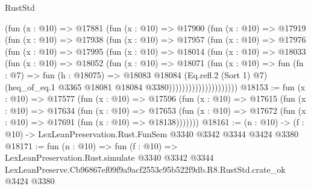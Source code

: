 \begin{lexlean}{RustStd}
\begin{coremodule}
                    (fun (x : @10) =>
                    @17881
                      (fun (x : @10) =>
                      @17900
                        (fun (x : @10) =>
                        @17919
                          (fun (x : @10) =>
                          @17938
                            (fun (x : @10) =>
                            @17957
                              (fun (x : @10) =>
                              @17976
                                (fun (x : @10) =>
                                @17995
                                  (fun (x : @10) =>
                                  @18014
                                    (fun (x : @10) =>
                                    @18033
                                      (fun (x : @10) =>
                                      @18052
                                        (fun (x : @10) =>
                                        @18071
                                          (fun (x : @10) =>
                                          fun (fn : @7) =>
                                          fun (h : @18075) =>
                                          @18083
                                            @18084
                                            (Eq.refl.{2} (Sort 1) @7)
                                            (heq_of_eq.{1}
                                              @3365
                                              @18081
                                              @18084
                                              @3380)))))))))))))))))))))
@18153 := fun (x : @10) =>
  @17577
    (fun (x : @10) =>
    @17596
      (fun (x : @10) =>
      @17615
        (fun (x : @10) =>
        @17634
          (fun (x : @10) =>
          @17653 (fun (x : @10) => @17672 (fun (x : @10) => @17691 (fun (x : @10) => @18138)))))))
@18161 := (n : @10) -> (f : @10) -> LexLeanPreservation.Rust.FunSem @3340 @3342 @3344 @3424 @3380
@18171 := fun (n : @10) =>
  fun (f : @10) =>
  LexLeanPreservation.Rust.simulate
    @3340
    @3342
    @3344
    LexLeanPreserve.Cb96867ef09f9a9acf2553c95b522f9db.R8.RustStd.crate_ok
    @3424
    @3380
\end{coremodule}
\end{lexlean}
